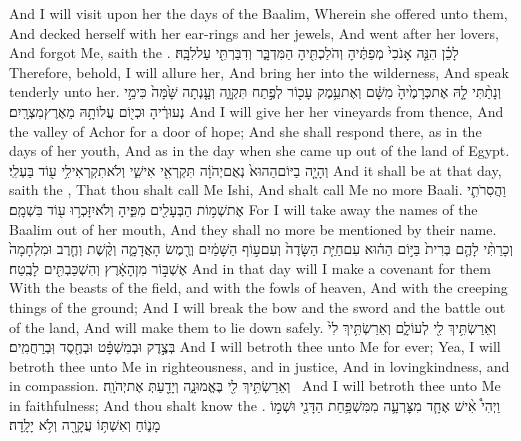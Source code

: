 {And I will visit upon her the days of the Baalim, Wherein she offered unto them, And decked herself with her ear-rings and her jewels, And went after her lovers, And forgot Me, saith the \lord.}
{לָכֵ֗ן הִנֵּ֤ה אָנֹכִי֙ מְפַתֶּ֔יהָ וְהֹלַכְתִּ֖יהָ הַמִּדְבָּ֑ר וְדִבַּרְתִּ֖י עַל\maqqaf לִבָּֽהּ׃}
{Therefore, behold, I will allure her, And bring her into the wilderness, And speak tenderly unto her.}
{וְנָתַ֨תִּי לָ֤הּ אֶת\maqqaf כְּרָמֶ֙יהָ֙ מִשָּׁ֔ם וְאֶת\maqqaf עֵ֥מֶק עָכ֖וֹר לְפֶ֣תַח תִּקְוָ֑ה וְעָ֤נְתָה שָּׁ֙מָּה֙ כִּימֵ֣י נְעוּרֶ֔יהָ וּכְי֖וֹם עֲלוֹתָ֥הּ מֵאֶרֶץ\maqqaf מִצְרָֽיִם׃}
{And I will give her her vineyards from thence, And the valley of Achor for a door of hope; And she shall respond there, as in the days of her youth, And as in the day when she came up out of the land of Egypt.}
{וְהָיָ֤ה בַיּוֹם\maqqaf הַהוּא֙ נְאֻם\maqqaf יְהֹוָ֔ה תִּקְרְאִ֖י אִישִׁ֑י וְלֹא\maqqaf תִקְרְאִי\maqqaf לִ֥י ע֖וֹד בַּעְלִֽי׃}
{And it shall be at that day, saith the \lord, That thou shalt call Me Ishi, And shalt call Me no more Baali.}
{וַהֲסִרֹתִ֛י אֶת\maqqaf שְׁמ֥וֹת הַבְּעָלִ֖ים מִפִּ֑יהָ וְלֹא\maqqaf יִזָּכְר֥וּ ע֖וֹד בִּשְׁמָֽם׃}
{For I will take away the names of the Baalim out of her mouth, And they shall no more be mentioned by their name.}
{וְכָרַתִּ֨י לָהֶ֤ם בְּרִית֙ בַּיּ֣וֹם הַה֔וּא עִם\maqqaf חַיַּ֤ת הַשָּׂדֶה֙ וְעִם\maqqaf ע֣וֹף הַשָּׁמַ֔יִם וְרֶ֖מֶשׂ הָאֲדָמָ֑ה וְקֶ֨שֶׁת וְחֶ֤רֶב וּמִלְחָמָה֙ אֶשְׁבּ֣וֹר מִן\maqqaf הָאָ֔רֶץ וְהִשְׁכַּבְתִּ֖ים לָבֶֽטַח׃}
{And in that day will I make a covenant for them With the beasts of the field, and with the fowls of heaven, And with the creeping things of the ground; And I will break the bow and the sword and the battle out of the land, And will make them to lie down safely.}
{וְאֵרַשְׂתִּ֥יךְ לִ֖י לְעוֹלָ֑ם וְאֵרַשְׂתִּ֥יךְ לִי֙ בְּצֶ֣דֶק וּבְמִשְׁפָּ֔ט וּבְחֶ֖סֶד וּֽבְרַחֲמִֽים׃}
{And I will betroth thee unto Me for ever; Yea, I will betroth thee unto Me in righteousness, and in justice, And in lovingkindness, and in compassion.}
{וְאֵרַשְׂתִּ֥יךְ לִ֖י בֶּאֱמוּנָ֑ה וְיָדַ֖עַתְּ אֶת\maqqaf יְהֹוָֽה׃ \petucha }
{And I will betroth thee unto Me in faithfulness; And thou shalt know the \lord.}
\label{haft_35}
\setcounter{chap}{13}
\setcounter{verse}{2}
{וַיְהִי֩ אִ֨ישׁ אֶחָ֧ד מִצׇּרְעָ֛ה מִמִּשְׁפַּ֥חַת הַדָּנִ֖י וּשְׁמ֣וֹ מָנ֑וֹחַ וְאִשְׁתּ֥וֹ עֲקָרָ֖ה וְלֹ֥א יָלָֽדָה׃}
